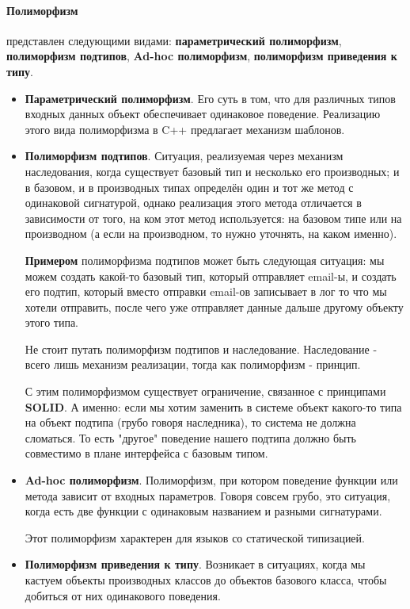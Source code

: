 \paragraph{Полиморфизм} представлен следующими видами: \textbf{параметрический полиморфизм}, \textbf{полиморфизм подтипов}, \textbf{Ad-hoc полиморфизм}, \textbf{полиморфизм приведения к типу}.
\begin{itemize}
    \item \textbf{Параметрический полиморфизм}. Его суть в том, что для различных типов входных данных объект обеспечивает одинаковое поведение. Реализацию этого вида полиморфизма в C++ предлагает механизм шаблонов.
    \item \textbf{Полиморфизм подтипов}. Ситуация, реализуемая через механизм наследования, когда существует базовый тип и несколько его производных; и в базовом, и в производных типах определён один и тот же метод с одинаковой сигнатурой, однако реализация этого метода отличается в зависимости от того, на ком этот метод используется: на базовом типе или на производном (а если на производном, то нужно уточнять, на каком именно).
    
    \textbf{Примером} полиморфизма подтипов может быть следующая ситуация: мы можем создать какой-то базовый тип, который отправляет email-ы, и создать его подтип, который вместо отправки email-ов записывает в лог то что мы хотели отправить, после чего уже отправляет данные дальше другому объекту этого типа.
    \begin{notice}
        Не стоит путать полиморфизм подтипов и наследование. Наследование - всего лишь механизм реализации, тогда как полиморфизм - принцип.
    \end{notice}
    \begin{notice}
        С этим полиморфизмом существует ограничение, связанное с принципами \textbf{SOLID}. А именно: если мы хотим заменить в системе объект какого-то типа на объект подтипа (грубо говоря наследника), то система не должна сломаться. То есть "другое" поведение нашего подтипа должно быть совместимо в плане интерфейса с базовым типом.
    \end{notice}
    
    \item \textbf{Ad-hoc полиморфизм}. Полиморфизм, при котором поведение функции или метода зависит от входных параметров. Говоря совсем грубо, это ситуация, когда есть две функции с одинаковым названием и разными сигнатурами.
    \begin{notice}
        Этот полиморфизм характерен для языков со статической типизацией.
    \end{notice}
    \item \textbf{Полиморфизм приведения к типу}. Возникает в ситуациях, когда мы кастуем объекты производных классов до объектов базового класса, чтобы добиться от них одинакового поведения.
\end{itemize}

